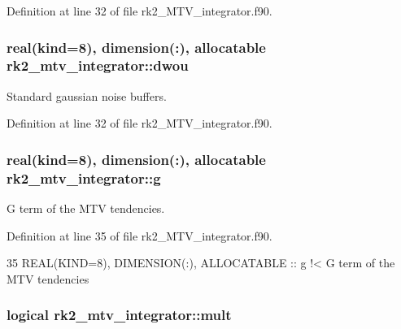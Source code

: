 Definition at line 32 of file rk2\+\_\+\+M\+T\+V\+\_\+integrator.\+f90.

\subsubsection[{\texorpdfstring{dwou}{dwou}}]{\setlength{\rightskip}{0pt plus 5cm}real(kind=8), dimension(\+:), allocatable rk2\+\_\+mtv\+\_\+integrator\+::dwou\hspace{0.3cm}{\ttfamily [private]}}\hypertarget{namespacerk2__mtv__integrator_af1862c97e660a0a557657dccbdc02fa8}{}\label{namespacerk2__mtv__integrator_af1862c97e660a0a557657dccbdc02fa8}


Standard gaussian noise buffers. 



Definition at line 32 of file rk2\+\_\+\+M\+T\+V\+\_\+integrator.\+f90.

\subsubsection[{\texorpdfstring{g}{g}}]{\setlength{\rightskip}{0pt plus 5cm}real(kind=8), dimension(\+:), allocatable rk2\+\_\+mtv\+\_\+integrator\+::g\hspace{0.3cm}{\ttfamily [private]}}\hypertarget{namespacerk2__mtv__integrator_a011fd16734ea127ef794053331a8294e}{}\label{namespacerk2__mtv__integrator_a011fd16734ea127ef794053331a8294e}


G term of the M\+TV tendencies. 



Definition at line 35 of file rk2\+\_\+\+M\+T\+V\+\_\+integrator.\+f90.


\begin{DoxyCode}
35   \textcolor{keywordtype}{REAL(KIND=8)}, \textcolor{keywordtype}{DIMENSION(:)}, \textcolor{keywordtype}{ALLOCATABLE} :: g\textcolor{comment}{                    !< G term of the MTV tendencies}
\end{DoxyCode}
\subsubsection[{\texorpdfstring{mult}{mult}}]{\setlength{\rightskip}{0pt plus 5cm}logical rk2\+\_\+mtv\+\_\+integrator\+::mult\hspace{0.3cm}{\ttfamily [private]}}\hypertarget{namespacerk2__mtv__integrator_a08097c59dbd88f4ac0624dffb29fd6b1}{}\label{namespacerk2__mtv__integrator_a08097c59dbd88f4ac0624dffb29fd6b1}


